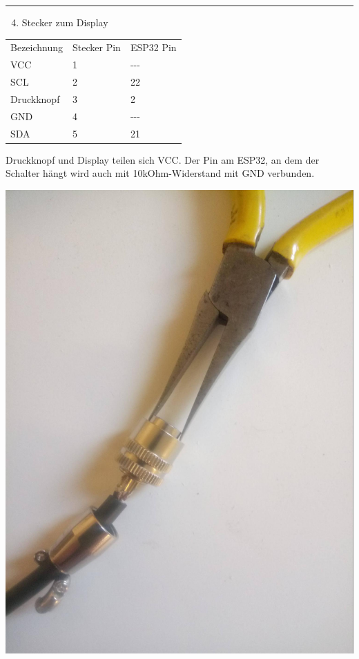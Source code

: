 \documentclass[
]{article}
\providecommand{\tightlist}{%
  \setlength{\itemsep}{0pt}\setlength{\parskip}{0pt}}
\begin{document}
\begin{center}\rule{0.5\linewidth}{0.5pt}\end{center}

{}

\begin{enumerate}
\setcounter{enumi}{3}
\tightlist
\item
  {Stecker zum Display}
\end{enumerate}

{}

\protect\hypertarget{t.7615705d67f555cade8b8088d668b61e9c94ee1e}{}{}\protect\hypertarget{t.5}{}{}

\begin{longtable}[]{@{}lll@{}}
\toprule
\endhead
{Bezeichnung} & {Stecker Pin} & {ESP32 Pin}\tabularnewline
{VCC} & {1} & {-\/-\/-}\tabularnewline
{SCL} & {2} & {22}\tabularnewline
{Druckknopf} & {3} & {2}\tabularnewline
{GND} & {4} & {-\/-\/-}\tabularnewline
{SDA} & {5} & {21}\tabularnewline
\bottomrule
\end{longtable}

{}

{}

{Druckknopf und Display teilen sich VCC. Der Pin am ESP32, an dem der Schalter hängt wird auch mit 10kOhm-Widerstand mit GND verbunden.}

{}

{}

{\includegraphics{images/image3.jpg}}
\end{document}
